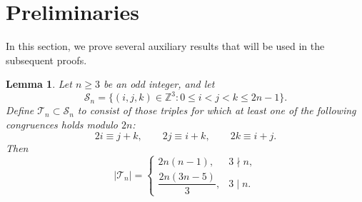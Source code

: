 \documentclass[11pt,reqno]{amsart}
\numberwithin{equation}{section}
\newtheorem{lemma}[theorem]{Lemma}
\begin{document}
\section{Preliminaries}\label{section-2}
In this section, we prove several auxiliary results that will be used in the subsequent proofs. 
\begin{lemma}\label{lem:triples-mod2n}
Let $n\geq3$ be an odd integer, and let
$$
\mathcal{S}_n = \{(i,j,k) \in \mathbb{Z}^3 : 0 \le i < j < k \le 2n-1\}.
$$
Define $\mathcal{T}_n \subset \mathcal{S}_n$ to consist of those triples for which at least one of the following congruences holds modulo $2n$:
$$
2i \equiv j+k,\qquad 2j \equiv i+k,\qquad 2k \equiv i+j.
$$
Then
$$
|\mathcal{T}_n| =
\begin{cases}
2n(n-1), & 3 \nmid n,\\[8pt]
\dfrac{2n(3n-5)}{3}, & 3 \mid n.
\end{cases}
$$
\end{lemma}
\end{document}
